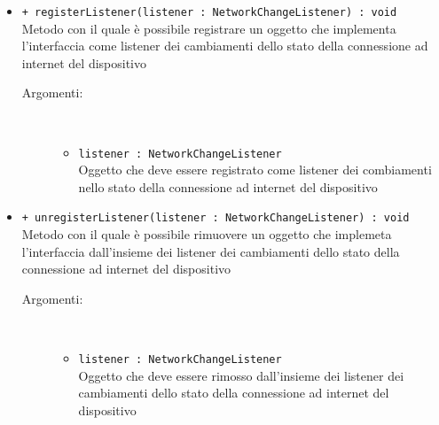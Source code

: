 \documentclass[../Tesi.tex]{subfiles}
\begin{document}
\begin{description}
\begin{itemize}
				\item \texttt{+ registerListener(listener : NetworkChangeListener) : void}\\
				Metodo con il quale è possibile registrare un oggetto che implementa l'interfaccia  come listener dei cambiamenti dello stato della connessione ad internet del dispositivo
				\begin{description}
					\item[Argomenti:] \
					\begin{itemize}
						\item \texttt{listener : NetworkChangeListener}\\
						Oggetto che deve essere registrato come listener dei combiamenti nello stato della connessione ad internet del dispositivo
					\end{itemize}
				\end{description}

				\item \texttt{+ unregisterListener(listener : NetworkChangeListener) : void}\\
				Metodo con il quale è possibile rimuovere un oggetto che implemeta l'interfaccia  dall'insieme dei listener dei cambiamenti dello stato della connessione ad internet del dispositivo
				\begin{description}
					\item[Argomenti:] \
					\begin{itemize}
						\item \texttt{listener : NetworkChangeListener}\\
						Oggetto che deve essere rimosso dall'insieme dei listener dei cambiamenti dello stato della connessione ad internet del dispositivo
					\end{itemize}
				\end{description}
			\end{itemize}
		\end{description}
\end{document}
